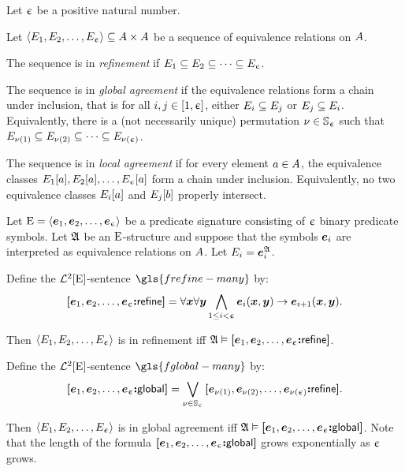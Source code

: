 Let $\upepsilon$ be a positive natural number.
\begin{definition}
Let $\left\langle E_{1}, E_{2}, \dots, E_{\upepsilon} \right\rangle \subseteq {A\times A}$ be
a sequence of equivalence relations on $A$.

The sequence is in \emph{refinement} if $E_{1} \subseteq E_{2} \subseteq
\dots \subseteq E_{\upepsilon}$.

The sequence is in \emph{global agreement} if the equivalence relations form a
chain under inclusion, that is for all $i, j \in [1, \upepsilon]$,
either $E_{i} \subseteq E_{j}$ or $E_{j} \subseteq E_{i}$.
Equivalently, there is a (not necessarily unique) permutation
$\nu \in \mathbb{S}_{\upepsilon}$ such that
$E_{\nu(1)} \subseteq E_{\nu(2)} \subseteq \dots \subseteq
E_{\nu(\upepsilon)}$.

The sequence is in \emph{local agreement} if for every element $a \in A$,
the equivalence classes $E_{1}[a], E_{2}[a], \dots, E_{\upepsilon}[a]$ form
a chain under inclusion.
Equivalently, no two equivalence classes $E_{i}[a]$ and $E_{j}[b]$
properly intersect.
\end{definition}

Let $\mathrm{E} = \left\langle \bm{e}_{1}, \bm{e}_{2}, \dots, \bm{e}_{\upepsilon} \right\rangle$ be a predicate signature
consisting of $\upepsilon$ binary predicate symbols.
Let $\mathfrak{A}$ be an $\mathrm{E}$-structure and suppose that the symbols $\bm{e}_{i}$ are
interpreted as equivalence relations on $A$. Let 
$E_{i} = \bm{e}_{i}^{\mathfrak{A}}$.
\begin{definition}
Define the $\mathcal{L}^{2}[\mathrm{E}]$-sentence $\gls{frefine-many}$ by:
\[
  {\bm{[}\bm{e}_{1},\bm{e}_{2},\dots,\bm{e}_{\upepsilon}\mathord{\bm{:}}\mathsf{refine}\bm{]}} =
  \forall\bm{x}\forall\bm{y} \bigwedge_{1 \leq i < \upepsilon}
  \bm{e}_{i}(\bm{x},\bm{y}) \rightarrow \bm{e}_{i+1}(\bm{x},\bm{y}).
\]
\end{definition}
Then $\left\langle E_{1},E_{2},\dots,E_{\upepsilon} \right\rangle$ is in refinement iff
$\mathfrak{A} \vDash {\bm{[}\bm{e}_{1},\bm{e}_{2},\dots,\bm{e}_{\upepsilon}\mathord{\bm{:}}\mathsf{refine}\bm{]}}$.

\begin{definition}
Define the $\mathcal{L}^{2}[\mathrm{E}]$-sentence $\gls{fglobal-many}$ by:
\[
  {\bm{[}\bm{e}_{1},\bm{e}_{2},\dots,\bm{e}_{\upepsilon}\mathord{\bm{:}}\mathsf{global}\bm{]}} =
  \bigvee_{\nu \in \mathbb{S}_{\upepsilon}}
  {\bm{[}\bm{e}_{\nu(1)},\bm{e}_{\nu(2)},\dots,\bm{e}_{\nu(\upepsilon)}\mathord{\bm{:}}\mathsf{refine}\bm{]}}.
\]
\end{definition}
Then $\left\langle E_{1},E_{2},\dots,E_{\upepsilon} \right\rangle$ is in global agreement iff
$\mathfrak{A} \vDash {\bm{[}\bm{e}_{1},\bm{e}_{2},\dots,\bm{e}_{\upepsilon}\mathord{\bm{:}}\mathsf{global}\bm{]}}$.
Note that the length of the formula ${\bm{[}\bm{e}_{1},\bm{e}_{2},\dots,\bm{e}_{\upepsilon}\mathord{\bm{:}}\mathsf{global}\bm{]}}$ grows
exponentially as $\upepsilon$ grows.

